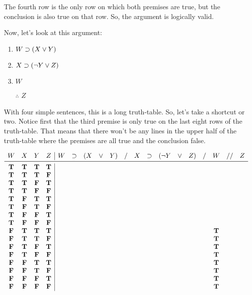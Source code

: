 \documentclass[../logic-text.tex]{subfiles}
\begin{document}
The fourth row is the only row on which both premises are true, but the conclusion is also true on that row. So, the argument is logically valid.


Now, let's look at this argument:

\begin{enumerate}
	\item \(W \supset (X \lor Y)\)
	\item \(X \supset (\neg Y \lor Z)\)
  \item \underline{ \(W\)\phantom{xxxxxxxx} }
	\item [$\therefore$] \(Z\)
\end{enumerate}


With four simple sentences, this is a long truth-table. So, let's take a shortcut or two. Notice first that the third premise is only true on the last eight rows of the truth-table. That means that there won't be any lines in the upper half of the truth-table where the premises are all true and the conclusion false.



\[
  \begin{array}{cccc|cccccccccccccccc}
    W & X & Y & Z & W & \lif & (X & \lor&  Y)&  /&  X&  \lif&  (\lneg Y &  \lor &  Z) & / & W & // & Z \\ \midrule
    \true & \true & \true & \true &&&&&&&&&&&&&&& \\
    \true & \true & \true & \false &&&&&&&&&&&&&&& \\
    \true & \true & \false & \true &&&&&&&&&&&&&&& \\
    \true & \true & \false & \false &&&&&&&&&&&&&&& \\
    \true & \false & \true & \true &&&&&&&&&&&&&&& \\
    \true & \false & \true & \false &&&&&&&&&&&&&&& \\
    \true & \false & \false & \true &&&&&&&&&&&&&&& \\
    \true & \false & \false & \false &&&&&&&&&&&&&&& \\
    \false & \true & \true & \true &&&&&&&&&&&&& \true && \\
    \false & \true & \true & \false &&&&&&&&&&&&& \true && \\
    \false & \true & \false & \true &&&&&&&&&&&&& \true && \\
    \false & \true & \false & \false &&&&&&&&&&&&& \true && \\
    \false & \false & \true & \true &&&&&&&&&&&&& \true && \\
    \false & \false & \true & \false &&&&&&&&&&&&& \true && \\
    \false & \false & \false & \true &&&&&&&&&&&&& \true && \\
    \false & \false & \false & \false &&&&&&&&&&&&& \true && \\
\end{array}
\]
\end{document}
